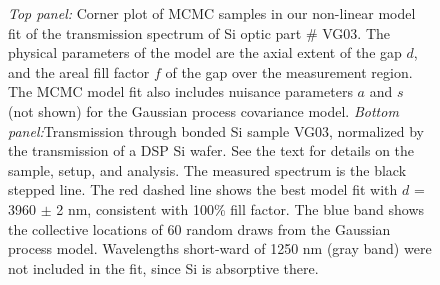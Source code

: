 


\begin{figure}[htbp]
    \centering
    	 \newline
	\caption[MCMC corner plot and fitted spectrum for gap size parameters for a large 4 $\mu$m interfacial gap]{ \emph{Top panel:} Corner plot of MCMC samples in our non-linear model fit of the transmission spectrum of Si optic part \# VG03.  The physical parameters of the model are the axial extent of the gap $d$, and the areal fill factor $f$ of the gap over the measurement region.  The MCMC model fit also includes nuisance parameters $a$ and $s$ (not shown) for the Gaussian process covariance model.  \emph{Bottom panel:}Transmission through bonded Si sample VG03, normalized by the transmission of a DSP Si wafer. See the text for details on the sample, setup, and analysis.  The measured spectrum is the black stepped line.  The red dashed line shows the best model fit with $d$ = 3960 $\pm$ 2 nm, consistent with 100\% fill factor.  The blue band shows the collective locations of 60 random draws from the Gaussian process model.  Wavelengths short-ward of 1250 nm (gray band) were not included in the fit, since Si is absorptive there.}
	\label{figVG03full} 
\end{figure}


